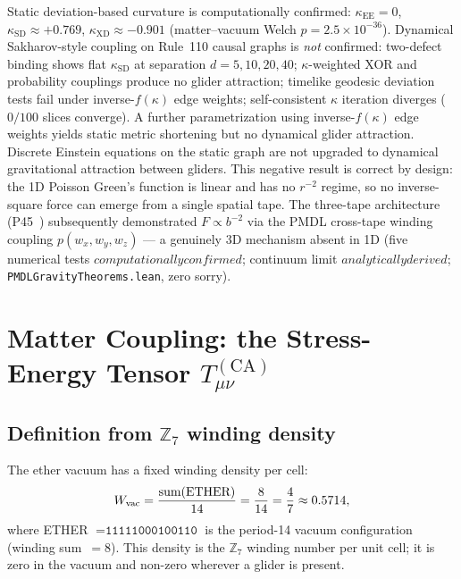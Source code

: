 \documentclass[11pt]{article}
\theoremstyle{remark}
\newcommand{\CatA}{computationally confirmed}
\newcommand{\CatAD}{analytically derived}
\begin{document}
Static deviation-based curvature is \CatA: $\kappa_{\mathrm{EE}} = 0$,
$\kappa_{\mathrm{SD}} \approx +0.769$, $\kappa_{\mathrm{XD}} \approx -0.901$
(matter--vacuum Welch $p = 2.5\times 10^{-36}$).
Dynamical Sakharov-style coupling on Rule~110 causal graphs is \emph{not} confirmed:
two-defect binding shows flat $\kappa_{\mathrm{SD}}$ at separation
$d = 5, 10, 20, 40$; $\kappa$-weighted XOR and probability couplings produce no
glider attraction; timelike geodesic deviation tests fail under inverse-$f(\kappa)$
edge weights; self-consistent $\kappa$ iteration diverges ($0/100$ slices converge).
A further parametrization using inverse-$f(\kappa)$ edge weights yields static metric shortening but no dynamical glider attraction.
Discrete Einstein equations on the static graph are not upgraded to dynamical
gravitational attraction between gliders.
This negative result is correct by design: the 1D Poisson Green's function is
linear and has no $r^{-2}$ regime, so no inverse-square force can emerge from
a single spatial tape.
The three-tape architecture (P45~\cite{SpivackThreeTapeCMCA}) subsequently demonstrated
$F \propto b^{-2}$ via the PMDL cross-tape winding coupling
$p(w_x,w_y,w_z)$ --- a genuinely 3D mechanism absent in 1D
(five numerical tests $\CatA$; continuum limit $\CatAD$;
\texttt{PMDLGravityTheorems.lean}, zero sorry).

\section{Matter Coupling: the Stress-Energy Tensor \texorpdfstring{$T_{\mu\nu}^{(\mathrm{CA})}$}{T\_(mu nu)\^{}(CA)}}
\label{sec:tmunu}

\subsection{Definition from \texorpdfstring{$\mathbb{Z}_7$}{Z7} winding density}
\label{ssec:tmunu_def}

The ether vacuum has a fixed winding density per cell:
\begin{equation}
  W_{\rm vac} = \frac{\text{sum}(\text{ETHER})}{14}
  = \frac{8}{14} = \frac{4}{7} \approx 0.5714,
  \label{eq:wvac}
\end{equation}
where ETHER $= \texttt{11111000100110}$ is the period-14 vacuum configuration
(winding sum~$= 8$).
This density is the $\mathbb{Z}_7$ winding number per unit cell; it is zero
in the vacuum and non-zero wherever a glider is present.
\end{document}
